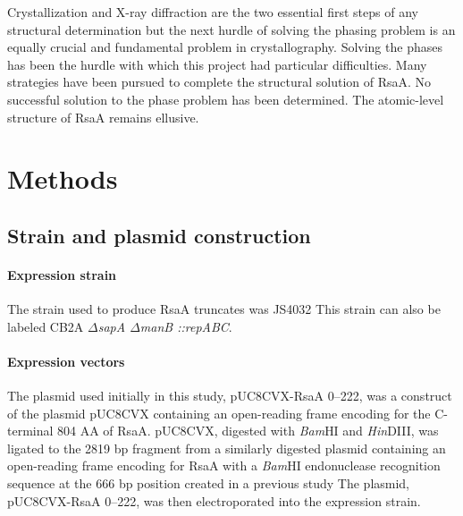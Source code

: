 Crystallization and X-ray diffraction are the two essential first steps of any
structural determination but the next hurdle of solving the phasing problem is an
equally crucial and fundamental problem in crystallography. Solving the phases
has been the hurdle with which this project had particular difficulties. Many
strategies have been pursued to complete the structural solution of RsaA. No
successful solution to the phase problem has been determined. The atomic-level structure of
RsaA remains ellusive.


\section{Methods}
\label{sec:crystal-materials-and-methods}

\subsection{Strain and plasmid construction}\label{sec:stra-plasm-constr}

\paragraph{Expression strain} The strain used to produce RsaA truncates was JS4032 
This strain can also be labeled \caulobacter{} CB2A \textit{$\Delta$sapA $\Delta$manB ::repABC}.

\paragraph{Expression vectors} The plasmid used initially in this study, pUC8CVX-RsaA \del{}0--222, was a construct of the plasmid pUC8CVX containing an open-reading frame encoding for the C-terminal 804 AA of RsaA. pUC8CVX, digested with \textit{Bam}HI and \textit{Hin}DIII, was ligated to the 2819 bp fragment from a similarly digested plasmid containing an open-reading frame encoding for RsaA with a \textit{Bam}HI  endonuclease recognition sequence at the 666 bp position created in a previous study The plasmid, pUC8CVX-RsaA \del{}0--222, was then electroporated into the expression strain. 

